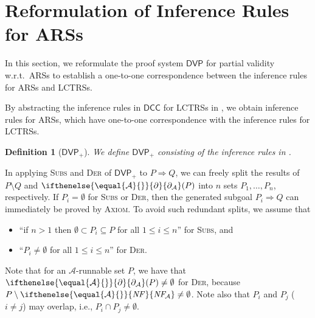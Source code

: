 \documentclass[10pt,a4paper]{article}
\newtheorem{definition}[theorem]{Definition}
\def\cA{\mathcal{A}}
\def\cR{\mathcal{R}}
\newcommand{\NF}[1][]{\ifthenelse{\equal{#1}{}}{\mathit{NF}}{\mathit{NF\!}_{#1}}}
\newcommand{\ReachPred}[2]{#1 \Rightarrow #2}
\newcommand{\Derivative}[1][\cR]{\ifthenelse{\equal{#1}{}}{\partial}{\partial_{#1}}}
\newcommand{\RuleName}[1]{{\rm \textsc{#1}}}
\newcommand{\DVP}[1][]{\mathsf{DVP}}
\newcommand{\DVPnew}[1][]{\mathsf{DVP}_+}
\newcommand{\DCC}[1][]{\mathsf{DCC}}
\begin{document}
\section{Reformulation of Inference Rules for ARSs}
\label{sec:all-path-reachability-for-ARSs}

In this section, we reformulate the proof system $\DVP$ for partial validity w.r.t.\ ARSs to establish a one-to-one correspondence between the inference rules for ARSs and LCTRSs.



By abstracting the inference rules in $\DCC$ for LCTRSs in , we obtain inference rules for ARSs, which have one-to-one correspondence with the inference rules for LCTRSs.

\begin{definition}[$\DVPnew$]
	\label{def:DVPnew}
	We define $\DVPnew$ consisting of the inference rules in .
\end{definition}
In applying \RuleName{Subs} and \RuleName{Der} of $\DVPnew$ to $\ReachPred{P}{Q}$, we can freely split the results of $P \setminus Q$ and $\Derivative[\cA](P)$ into $n$ sets $P_1,\ldots,P_n$, respectively.
If $P_i=\emptyset$ for \RuleName{Subs} or \RuleName{Der}, then the generated subgoal $\ReachPred{P_i}{Q}$ can immediately be proved by \RuleName{Axiom}.
To avoid such redundant splits, we assume that
\begin{itemize}
	\item ``if $n > 1$ then
	      $\emptyset \subset P_i \subseteq P$ for all $1 \leq i \leq n$'' for \RuleName{Subs},
	      and
	\item ``$P_i \ne \emptyset$ for all $1 \leq i \leq n$'' for \RuleName{Der}.
\end{itemize}
Note that for an $\cA$-runnable set $P$, we have that $\Derivative[\cA](P)\ne\emptyset$ for \RuleName{Der}, because
$P \setminus \NF[\cA]  \ne \emptyset$.
Note also that $P_i$ and $P_j$ ($i \ne j$) may overlap, i.e., $P_i \cap P_j \ne \emptyset$.
\end{document}
